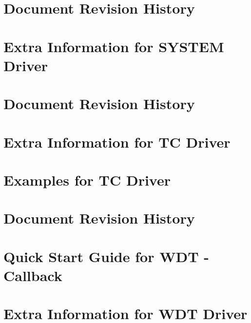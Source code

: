 \documentclass[twoside]{book}
\newcommand{\+}{\discretionary{\mbox{\scriptsize$\hookleftarrow$}}{}{}}
\begin{document}
\chapter{Document Revision History}
\label{asfdoc_sam0_system_pinmux_document_revision_history}

\chapter{Extra Information for SYSTEM Driver}
\label{asfdoc_sam0_system_extra}

\chapter{Document Revision History}
\label{asfdoc_sam0_system_document_revision_history}

\chapter{Extra Information for TC Driver}
\label{asfdoc_sam0_tc_extra}

\chapter{Examples for TC Driver}
\label{asfdoc_sam0_tc_exqsg}

\chapter{Document Revision History}
\label{asfdoc_sam0_tc_document_revision_history}

\chapter{Quick Start Guide for WDT -\/ Callback}
\label{asfdoc_sam0_wdt_callback_use_case}

\chapter{Extra Information for WDT Driver}
\label{asfdoc_sam0_wdt_extra}

\end{document}
